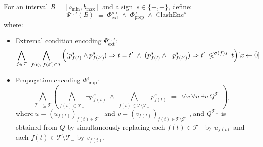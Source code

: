 \documentclass[runningheads]{llncs}
\newcommand{\cmpsignstrict}[1]{\lessgtr^{#1}}
\newcommand{\coeffsign}[1]{\sigma(#1)}
\newcommand{\subst}[3]{#1[#2\leftarrow #3]}
\newcommand{\repr}[1]{\hat{#1}}
\begin{document}
\begin{definition}
\label{def:interval-extension-formulas-CNF}
For an interval $B = [b_{\min}, b_{\max}]$ and a sign~$s\in\{+,-\}$, define:
\[\Psi^{s,\text{e}}(B) \;\equiv\; \Phi^{s,\text{e}}_{\text{ext}} \;\land\; \Phi_{\text{prop}}^{\text{e}} \;\land\; \text{ClashEnc}^s\]
where:
\begin{itemize}
    \item Extremal condition encoding $\Phi^{s,\text{e}}_{\text{ext}}$:
    \begin{align*}
        \subst{
        \bigwedge_{f \in \mathcal{F}}\ \bigwedge_{\substack{f(t),\, f(t') \in \mathcal{T}}}
        \Bigl( (p^s_{f(t)} \land p^s_{f(t')}) \Rightarrow t = t' \;\land\; 
        (p^s_{f(t)} \land \neg p^s_{f(t')}) \Rightarrow t' \;\cmpsignstrict{\coeffsign{f}s}\; t \Bigr)}{x}{\repr{0}}
    \end{align*}
   
    \item Propagation encoding $\Phi_{\text{prop}}^{\text{e}}$:%
    \[
    \bigwedge_{\mathcal{T}_{\!-}\subseteq\mathcal{T}}
    \left(\bigwedge_{f(t)\in\mathcal{T}_{\!-}} \neg p^s_{f(t)} \;\wedge\; \bigwedge_{f(t)\in\mathcal{T}\setminus\mathcal{T}_{\!-}} p^s_{f(t)}\;\Rightarrow\; \forall x\, \forall \bar{u}\, \exists \bar{v}\; Q^{\mathcal{T}_{\!-}}\right),
    \]
    where $\bar{u}=(u_{f(t)})_{f(t)\in\mathcal{T}_{\!-}}$ and $\bar{v}=(v_{f(t)})_{f(t)\in\mathcal{T}\setminus\mathcal{T}_{\!-}}$, and $Q^{\mathcal{T}_{\!-}}$ is obtained from $Q$ by simultaneously replacing each $f(t)\in\mathcal{T}_{\!-}$ by $u_{f(t)}$ and each $f(t)\in\mathcal{T}\setminus\mathcal{T}_{\!-}$ by $v_{f(t)}$.


        

\end{itemize}
\end{definition}
\end{document}
